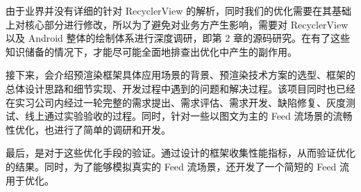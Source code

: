 由于业界并没有详细的针对 RecyclerView 的解析，同时我们的优化需要在其基础上对核心部分进行修改，所以为了避免对业务方产生影响，需要对 RecyclerView 以及 Android 整体的绘制体系进行深度调研，即第 2 章的源码研究。在有了这些知识储备的情况下，才能尽可能全面地排查出优化中产生的副作用。

接下来，会介绍预渲染框架具体应用场景的背景、预渲染技术方案的选型、框架的总体设计思路和细节实现、开发过程中遇到的问题和解决过程。该项目同时也已经在实习公司内经过一轮完整的需求提出、需求评估、需求开发、缺陷修复、灰度测试、线上通过实验验收的过程。同时，针对一些以图文为主的 Feed 流场景的流畅性优化，也进行了简单的调研和开发。

最后，是对于这些优化手段的验证。通过设计的框架收集性能指标，从而验证优化的结果。同时，为了能够模拟真实的 Feed 流场景，还开发了一个简短的 Feed 流用于优化。